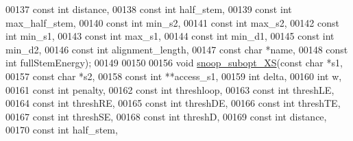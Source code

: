 \begin{DoxyCode}
00137                            \textcolor{keyword}{const} \textcolor{keywordtype}{int}  distance,
00138                            \textcolor{keyword}{const} \textcolor{keywordtype}{int}  half\_stem,
00139                            \textcolor{keyword}{const} \textcolor{keywordtype}{int}  max\_half\_stem,
00140                            \textcolor{keyword}{const} \textcolor{keywordtype}{int}  min\_s2,
00141                            \textcolor{keyword}{const} \textcolor{keywordtype}{int}  max\_s2,
00142                            \textcolor{keyword}{const} \textcolor{keywordtype}{int}  min\_s1,
00143                            \textcolor{keyword}{const} \textcolor{keywordtype}{int}  max\_s1,
00144                            \textcolor{keyword}{const} \textcolor{keywordtype}{int}  min\_d1,
00145                            \textcolor{keyword}{const} \textcolor{keywordtype}{int}  min\_d2,
00146                            \textcolor{keyword}{const} \textcolor{keywordtype}{int}  alignment\_length,
00147                            \textcolor{keyword}{const} \textcolor{keywordtype}{char} *name,
00148                            \textcolor{keyword}{const} \textcolor{keywordtype}{int}  fullStemEnergy);
00149 
00150 
00156 \textcolor{keywordtype}{void} \mbox{\hyperlink{snoop_8h_a239b6825bd140425349a72dedb971cb2}{snoop\_subopt\_XS}}(\textcolor{keyword}{const} \textcolor{keywordtype}{char} *s1,
00157                      \textcolor{keyword}{const} \textcolor{keywordtype}{char} *s2,
00158                      \textcolor{keyword}{const} \textcolor{keywordtype}{int}  **access\_s1,
00159                      \textcolor{keywordtype}{int}        delta,
00160                      \textcolor{keywordtype}{int}        w,
00161                      \textcolor{keyword}{const} \textcolor{keywordtype}{int}  penalty,
00162                      \textcolor{keyword}{const} \textcolor{keywordtype}{int}  threshloop,
00163                      \textcolor{keyword}{const} \textcolor{keywordtype}{int}  threshLE,
00164                      \textcolor{keyword}{const} \textcolor{keywordtype}{int}  threshRE,
00165                      \textcolor{keyword}{const} \textcolor{keywordtype}{int}  threshDE,
00166                      \textcolor{keyword}{const} \textcolor{keywordtype}{int}  threshTE,
00167                      \textcolor{keyword}{const} \textcolor{keywordtype}{int}  threshSE,
00168                      \textcolor{keyword}{const} \textcolor{keywordtype}{int}  threshD,
00169                      \textcolor{keyword}{const} \textcolor{keywordtype}{int}  distance,
00170                      \textcolor{keyword}{const} \textcolor{keywordtype}{int}  half\_stem,

\end{DoxyCode}
